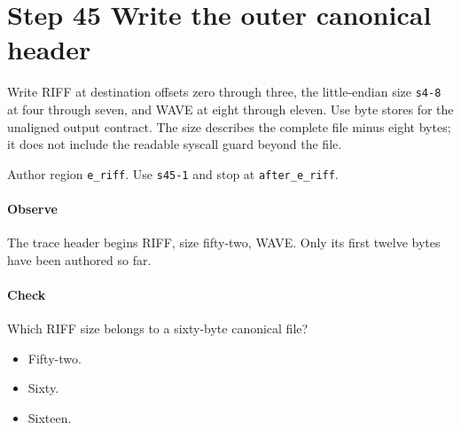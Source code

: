 \section{Step 45 Write the outer canonical header}\label{pcm-wav-s45}
Write RIFF at destination offsets zero through three, the little-endian size \texttt{s4-8} at four through seven, and WAVE at eight through eleven. Use byte stores for the unaligned output contract. The size describes the complete file minus eight bytes; it does not include the readable syscall guard beyond the file.

Author region \texttt{e\_riff}. Use \texttt{s45-1} and stop at \texttt{after\_e\_riff}.

\paragraph{Observe} The trace header begins RIFF, size fifty-two, WAVE. Only its first twelve bytes have been authored so far.

\paragraph{Check} Which RIFF size belongs to a sixty-byte canonical file?
\begin{itemize}
  \item[A.] Fifty-two.
  \item[B.] Sixty.
  \item[C.] Sixteen.
\end{itemize}
